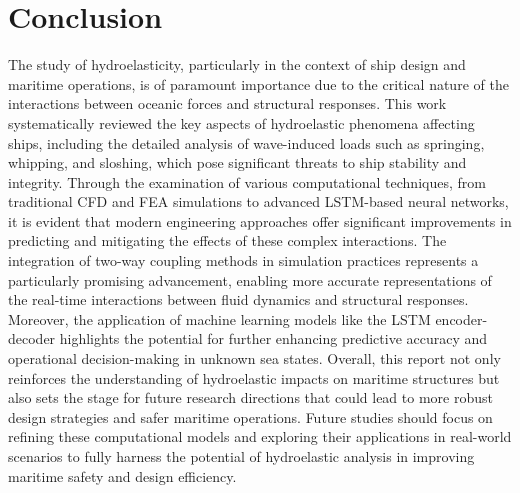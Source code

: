\documentclass[12pt]{article} %
\begin{document}
\section{Conclusion}
The study of hydroelasticity, particularly in the context of ship design and maritime operations, is of paramount importance due to the critical nature of the interactions between 
oceanic forces and structural responses. This work systematically reviewed the key aspects of hydroelastic phenomena affecting ships, including the detailed analysis of 
wave-induced loads such as springing, whipping, and sloshing, which pose significant threats to ship stability and integrity. Through the examination of various computational 
techniques, from traditional CFD and FEA simulations to advanced LSTM-based neural networks, it is evident that modern engineering approaches offer significant improvements 
in predicting and mitigating the effects of these complex interactions. The integration of two-way coupling methods in simulation practices represents a particularly promising 
advancement, enabling more accurate representations of the real-time interactions between fluid dynamics and structural responses. Moreover, the application of machine learning 
models like the LSTM encoder-decoder highlights the potential for further enhancing predictive accuracy and operational decision-making in unknown sea states. Overall, this 
report not only reinforces the understanding of hydroelastic impacts on maritime structures but also sets the stage for future research directions that could lead to more 
robust design strategies and safer maritime operations. Future studies should focus on refining these computational models and exploring their applications in real-world 
scenarios to fully harness the potential of hydroelastic analysis in improving maritime safety and design efficiency.
\end{document}
